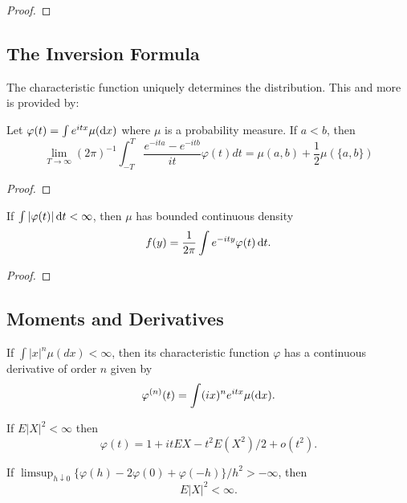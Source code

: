 \begin{proof}

\end{proof}

\subsection{The Inversion Formula}

The characteristic function uniquely determines the distribution. This and more is provided by:
\begin{theorem}
	Let \(\varphi(t)=\int e^{itx}\mu(\mathop{}\!\mathrm{d} x)\) where \(\mu\) is a probability measure. If \(a<b\), then
	\begin{equation}
		\lim _{T \rightarrow \infty}(2 \pi)^{-1} \int_{-T}^{T} \frac{e^{-i t a}-e^{-i t b}}{i t} \varphi(t) d t=\mu(a, b)+\frac{1}{2} \mu(\{a, b\})
	\end{equation}
\end{theorem}

\begin{proof}

\end{proof}

\begin{theorem}
	If \(\int|\varphi(t)|\mathop{}\!\mathrm{d} t<\infty\), then \(\mu\) has bounded continuous density
	\begin{equation}
		f(y)=\frac{1}{2\pi}\int e^{-ity}\varphi(t) \mathop{}\!\mathrm{d} t.
	\end{equation}
\end{theorem}

\begin{proof}

\end{proof}

\subsection{Moments and Derivatives}

\begin{theorem}
	If \(\int|x|^{n}\mu(d x)<\infty\), then its characteristic function \(\varphi\) has a continuous derivative of order \(n\) given by
	\begin{equation}
		\varphi^{(n)}(t)=\int(i x)^{n}e^{itx}\mu(\mathop{}\!\mathrm{d} x).
	\end{equation}
\end{theorem}

\begin{theorem}
	If \(E|X|^{2}<\infty\) then
	\begin{equation}
		\varphi(t)=1+itEX-t^{2}E\left(X^{2}\right)/2+o\left(t^{2}\right).
	\end{equation}
\end{theorem}

\begin{theorem}
	If \(\limsup_{h\downarrow 0}\{\varphi(h)-2\varphi(0)+\varphi(-h)\}/h^{2}>-\infty\), then
	\begin{equation}
		E|X|^{2}<\infty.
	\end{equation}
\end{theorem}
